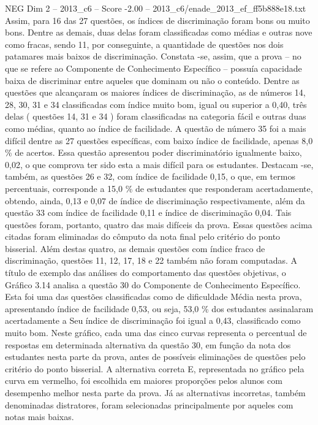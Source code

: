 \begin{textsample}{NEG Dim 2 – 2013\_c6 – Score -2.00 – 2013\_c6/enade\_2013\_ef\_ff5b888e18.txt}
Assim, para 16 das 27 questões, os índices de discriminação foram bons ou muito bons.
Dentre as demais, duas delas foram classificadas como médias e outras nove como fracas, sendo 11, por conseguinte, a quantidade de questões nos dois patamares mais baixos de discriminação.
Constata -se, assim, que a prova – no que se refere ao Componente de Conhecimento Específico – possuía capacidade baixa de discriminar entre aqueles que dominam ou não o conteúdo.
Dentre as questões que alcançaram os maiores índices de discriminação, as de números 14, 28, 30, 31 e 34 classificadas com índice muito bom, igual ou superior a 0,40, três delas ( questões 14, 31 e 34 ) foram classificadas na categoria fácil e outras duas como médias, quanto ao índice de facilidade.
A questão de número 35 foi a mais difícil dentre as 27 questões específicas, com baixo índice de facilidade, apenas 8,0 \% de acertos.
Essa questão apresentou poder discriminatório igualmente baixo, 0,02, o que comprova ter sido esta a mais difícil para os estudantes.
Destacam -se, também, as questões 26 e 32, com índice de facilidade 0,15, o que, em termos percentuais, corresponde a 15,0 \% de estudantes que responderam acertadamente, obtendo, ainda, 0,13 e 0,07 de índice de discriminação respectivamente, além da questão 33 com índice de facilidade 0,11 e índice de discriminação 0,04.
Tais questões foram, portanto, quatro das mais difíceis da prova.
Essas questões acima citadas foram eliminadas do cômputo da nota final pelo critério do ponto bisserial.
Além destas quatro, as demais questões com índice fraco de discriminação, questões 11, 12, 17, 18 e 22 também não foram computadas.
A título de exemplo das análises do comportamento das questões objetivas, o Gráfico 3.14 analisa a questão 30 do Componente de Conhecimento Específico.
Esta foi uma das questões classificadas como de dificuldade Média nesta prova, apresentando índice de facilidade 0,53, ou seja, 53,0 \% dos estudantes assinalaram acertadamente a Seu índice de discriminação foi igual a 0,43, classificado como muito bom.
Neste gráfico, cada uma das cinco curvas representa o percentual de respostas em determinada alternativa da questão 30, em função da nota dos estudantes nesta parte da prova, antes de possíveis eliminações de questões pelo critério do ponto bisserial.
A alternativa correta E, representada no gráfico pela curva em vermelho, foi escolhida em maiores proporções pelos alunos com desempenho melhor nesta parte da prova.
Já as alternativas incorretas, também denominadas distratores, foram selecionadas principalmente por aqueles com notas mais baixas.

\end{textsample}
